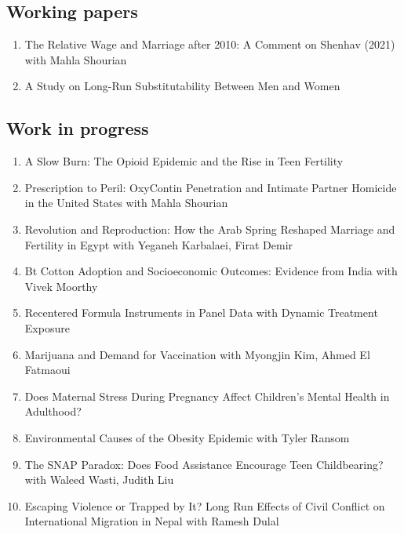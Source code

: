 \documentclass[10.5pt]{article}
\begin{document}
\subsection{Working papers}
\begin{enumerate}
\item The Relative Wage and Marriage after 2010: A Comment on Shenhav (2021) with Mahla Shourian
\item A Study on Long-Run Substitutability Between Men and Women
\end{enumerate}
\subsection{Work in progress}
\begin{enumerate}
\item A Slow Burn: The Opioid Epidemic and the Rise in Teen Fertility
\item Prescription to Peril: OxyContin Penetration and Intimate Partner Homicide in the United States with Mahla Shourian
\item Revolution and Reproduction: How the Arab Spring Reshaped Marriage and Fertility in Egypt with Yeganeh Karbalaei, Firat Demir
\item Bt Cotton Adoption and Socioeconomic Outcomes: Evidence from India with Vivek Moorthy
\item Recentered Formula Instruments in Panel Data with Dynamic Treatment Exposure
\item Marijuana and Demand for Vaccination with Myongjin Kim, Ahmed El Fatmaoui
\item Does Maternal Stress During Pregnancy Affect Children's Mental Health in Adulthood?
\item Environmental Causes of the Obesity Epidemic with Tyler Ransom
\item The SNAP Paradox: Does Food Assistance Encourage Teen Childbearing? with Waleed Wasti, Judith Liu
\item Escaping Violence or Trapped by It? Long Run Effects of Civil Conflict on International Migration in Nepal with Ramesh Dulal
\end{enumerate}
\end{document}
